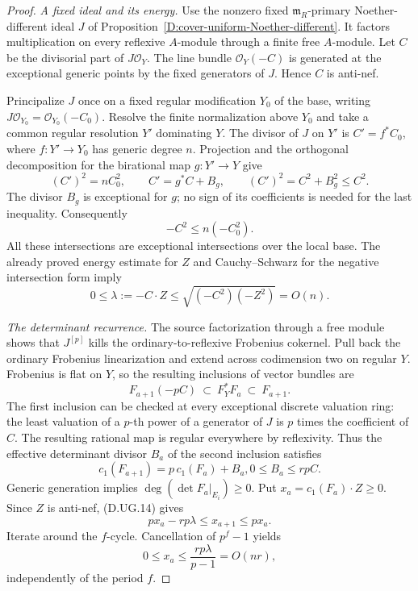 \begin{proof}
\emph{A fixed ideal and its energy.}
Use the nonzero fixed $\mathfrak m_R$-primary Noether-different
ideal $J$ of Proposition~\ref{D:cover-uniform-Noether-different}.
It factors multiplication on every reflexive $A$-module through
a finite free $A$-module. Let $C$ be the divisorial part of
$J\mathcal O_Y$. The line bundle $\mathcal O_Y(-C)$ is
generated at the exceptional generic points by the fixed
generators of $J$. Hence $C$ is anti-nef.

Principalize $J$ once on a fixed regular modification $Y_0$
of the base, writing $J\mathcal O_{Y_0}=\mathcal O_{Y_0}(-C_0)$.
Resolve the finite normalization above $Y_0$ and take a common
regular resolution $Y'$ dominating $Y$. The divisor of $J$
on $Y'$ is $C'=f^*C_0$, where $f:Y'\to Y_0$ has generic
degree $n$. Projection and the orthogonal decomposition for
the birational map $g:Y'\to Y$ give
\[
 (C')^2=nC_0^2,\qquad C'=g^*C+B_g,\qquad
 (C')^2=C^2+B_g^2\le C^2.
\]
The divisor $B_g$ is exceptional for $g$; no sign of its
coefficients is needed for the last inequality. Consequently
\[
                  -C^2\le n(-C_0^2).
                                                               \tag{D.UG.11}
\]
All these intersections are exceptional intersections over the
local base. The already proved energy estimate for $Z$ and
Cauchy--Schwarz for the negative intersection form imply
\[
       0\le\lambda:=-C\cdot Z
           \le\sqrt{(-C^2)(-Z^2)}=O(n).               \tag{D.UG.12}
\]

\emph{The determinant recurrence.}
The source factorization through a free module shows that
$J^{[p]}$ kills the ordinary-to-reflexive Frobenius cokernel.
Pull back the ordinary Frobenius linearization and extend
across codimension two on regular $Y$. Frobenius is flat on
$Y$, so the resulting inclusions of vector bundles are
\[
        F_{a+1}(-pC)\ \subset\ F_Y^*F_a\ \subset\ F_{a+1}.
                                                               \tag{D.UG.13}
\]
The first inclusion can be checked at every exceptional
discrete valuation ring: the least valuation of a $p$-th
power of a generator of $J$ is $p$ times the coefficient
of $C$. The resulting rational map is regular everywhere
by reflexivity. Thus the effective determinant divisor
$B_a$ of the second inclusion satisfies
\[
       c_1(F_{a+1})=p\,c_1(F_a)+B_a,
                    0\le B_a\le rpC.                 \tag{D.UG.14}
\]
Generic generation implies $\deg(\det F_a|_{E_i})\ge0$.
Put $x_a=c_1(F_a)\cdot Z\ge0$. Since $Z$ is anti-nef,
(D.UG.14) gives
\[
                   p x_a-rp\lambda\le x_{a+1}\le p x_a.
\]
Iterate around the $f$-cycle. Cancellation of $p^f-1$ yields
\[
                   0\le x_a\le\frac{rp\lambda}{p-1}=O(nr),
                                                               \tag{D.UG.15}
\]
independently of the period $f$.


\end{proof}
